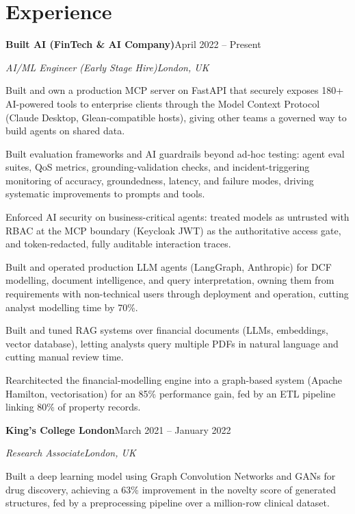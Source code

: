 \documentclass[10pt,a4paper]{article}
\newcommand{\entry}[4]{%
  {\color{company}\bfseries #1}\hfill {\color{muted}#2}\par
  \vspace{1pt}
  {\itshape #3}\hfill {\color{muted}\itshape #4}\par
  \vspace{3pt}%
}
\begin{document}
\section{Experience}
\entry{Built AI (FinTech \& AI Company)}{April 2022 -- Present}{AI/ML Engineer (Early Stage Hire)}{London, UK}
\begin{tight}
  \item Built and own a production MCP server on FastAPI that securely exposes 180+ AI-powered tools to enterprise clients through the Model Context Protocol (Claude Desktop, Glean-compatible hosts), giving other teams a governed way to build agents on shared data.
  \item Built evaluation frameworks and AI guardrails beyond ad-hoc testing: agent eval suites, QoS metrics, grounding-validation checks, and incident-triggering monitoring of accuracy, groundedness, latency, and failure modes, driving systematic improvements to prompts and tools.
  \item Enforced AI security on business-critical agents: treated models as untrusted with RBAC at the MCP boundary (Keycloak JWT) as the authoritative access gate, and token-redacted, fully auditable interaction traces.
  \item Built and operated production LLM agents (LangGraph, Anthropic) for DCF modelling, document intelligence, and query interpretation, owning them from requirements with non-technical users through deployment and operation, cutting analyst modelling time by 70\%.
  \item Built and tuned RAG systems over financial documents (LLMs, embeddings, vector database), letting analysts query multiple PDFs in natural language and cutting manual review time.
  \item Rearchitected the financial-modelling engine into a graph-based system (Apache Hamilton, vectorisation) for an 85\% performance gain, fed by an ETL pipeline linking 80\% of property records.
\end{tight}

\entry{King's College London}{March 2021 -- January 2022}{Research Associate}{London, UK}
\begin{tight}
  \item Built a deep learning model using Graph Convolution Networks and GANs for drug discovery, achieving a 63\% improvement in the novelty score of generated structures, fed by a preprocessing pipeline over a million-row clinical dataset.
\end{tight}
\end{document}
